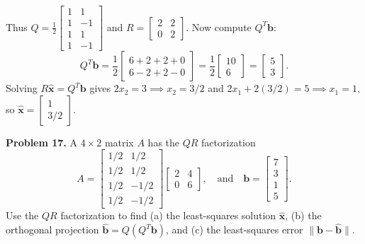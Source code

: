 \documentclass[11pt, letterpaper]{article}
\theoremstyle{definition}
\theoremstyle{remark}
\begin{document}
Thus $Q = \frac{1}{2}\begin{bmatrix} 1 & 1 \\ 1 & -1 \\ 1 & 1 \\ 1 & -1 \end{bmatrix}$ and $R = \begin{bmatrix} 2 & 2 \\ 0 & 2 \end{bmatrix}$. Now compute $Q^T \mathbf{b}$:
\[
Q^T \mathbf{b} = \frac{1}{2} \begin{bmatrix} 6+2+2+0 \\ 6-2+2-0 \end{bmatrix} = \frac{1}{2} \begin{bmatrix} 10 \\ 6 \end{bmatrix} = \begin{bmatrix} 5 \\ 3 \end{bmatrix}.
\]
Solving $R\hat{\mathbf{x}} = Q^T \mathbf{b}$ gives $2x_2 = 3 \implies x_2 = 3/2$ and $2x_1 + 2(3/2) = 5 \implies x_1 = 1$, so $\hat{\mathbf{x}} = \begin{bmatrix} 1 \\ 3/2 \end{bmatrix}$.

\textbf{Problem 17.} A $4 \times 2$ matrix $A$ has the $QR$ factorization
\[
A = \begin{bmatrix} 1/2 & 1/2 \\ 1/2 & 1/2 \\ 1/2 & -1/2 \\ 1/2 & -1/2 \end{bmatrix} \begin{bmatrix} 2 & 4 \\ 0 & 6 \end{bmatrix}, \quad \text{and} \quad \mathbf{b} = \begin{bmatrix} 7 \\ 3 \\ 1 \\ 5 \end{bmatrix}.
\]
Use the $QR$ factorization to find (a) the least-squares solution $\hat{\mathbf{x}}$, (b) the orthogonal projection $\hat{\mathbf{b}} = Q(Q^T \mathbf{b})$, and (c) the least-squares error $\|\mathbf{b} - \hat{\mathbf{b}}\|$.
\end{document}
